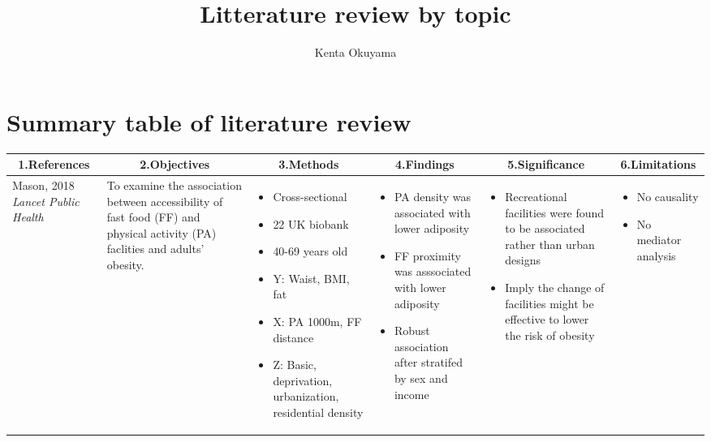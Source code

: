 \documentclass{article}
\title{Litterature review by topic}
\author{Kenta Okuyama}
\begin{document}
\maketitle
\tableofcontents
\newpage
{}

\section{Summary table of literature review}

\begin{longtable}[ht!]{ m{2cm} m{4cm} m{6cm} m{5cm} m{4cm} m{3cm} } %
	\hline \hline
\multicolumn{1}{c}{1.References} & \multicolumn{1}{c}{2.Objectives} & \multicolumn{1}{c}{3.Methods} & \multicolumn{1}{c}{4.Findings} & \multicolumn{1}{c}{5.Significance} & \multicolumn{1}{c}{6.Limitations} \\
	\hline
	Mason, 2018 \textit{Lancet Public Health} & 
	To examine the association between accessibility of fast food (FF) and physical activity (PA) faclities and adults' obesity. & 
	\begin{itemize}[noitemsep,topsep=0pt]
		\item Cross-sectional  \item 22 UK biobank  \item 40-69 years old  \item Y: Waist, BMI, fat  \item X: PA 1000m, FF distance \item Z: Basic, deprivation, urbanization, residential density
	\end{itemize} &
	\begin{itemize}[noitemsep,topsep=0pt]
		\item PA density was associated with lower adiposity \item FF proximity was asssociated with lower adiposity \item Robust association after stratifed by sex and income  
		\end{itemize} &
		\begin{itemize}[noitemsep,topsep=0pt] \item Recreational facilities were found to be associated rather than urban designs \item Imply the change of facilities might be effective to lower the risk of obesity
		\end{itemize} &
		\begin{itemize}[noitemsep,topsep=0pt] \item No causality \item No mediator analysis
		\end{itemize} \\
	\hline


\end{longtable}
\end{document}
